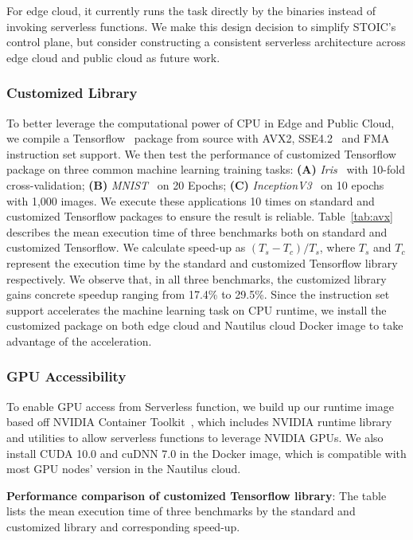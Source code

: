  For edge cloud, it currently runs the task directly by the binaries instead of invoking serverless functions. We make this design decision to simplify STOIC's control plane, but consider constructing a consistent serverless architecture across edge cloud and public cloud as future work.
 
 \BlankLine
 \subsubsection{Customized Library}
 To better leverage the computational power of CPU in Edge and Public Cloud, we compile a Tensorflow~\cite{ref:tensorflow} package from source with AVX2, SSE4.2~\cite{ref:avx} and FMA~\cite{ref:fma} instruction set support. We then test the performance of customized Tensorflow package on three common machine learning training tasks: \textbf{(A)} \textit{Iris}~\cite{ref:iris} with 10-fold cross-validation; \textbf{(B)} \textit{MNIST}~\cite{ref:mnist} on 20 Epochs; \textbf{(C)} \textit{InceptionV3}~\cite{ref:v3} on 10 epochs with 1,000 images. We execute these applications 10 times on standard and customized Tensorflow packages to ensure the result is reliable. Table~\ref{tab:avx} describes the mean execution time of three benchmarks both on standard and customized Tensorflow. We calculate speed-up as $(T_s - T_c) / T_s$, where $T_s$ and $T_c$ represent the execution time by the standard and customized Tensorflow library respectively. We observe that, in all three benchmarks, the customized library gains concrete speedup ranging from 17.4\% to 29.5\%. Since the instruction set support accelerates the machine learning task on CPU runtime, we install the customized package on both edge cloud and Nautilus cloud Docker image to take advantage of the acceleration.
 
 \BlankLine
 \subsubsection{GPU Accessibility}
 To enable GPU access from Serverless function, we build up our runtime image based off NVIDIA Container Toolkit~\cite{ref:nvidia}, which includes NVIDIA runtime library and utilities to allow serverless functions to leverage NVIDIA GPUs. We also install CUDA 10.0 and cuDNN 7.0 in the Docker image, which is compatible with most GPU nodes' version in the Nautilus cloud. 
 
\begin{table}[]
\centering

\caption{\textbf{Performance comparison of customized Tensorflow library}: The table lists the mean execution time of three benchmarks by the standard and customized library and corresponding speed-up.  }
\label{tab:avx}
\end{table}
 
